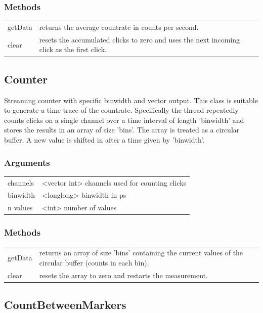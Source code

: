 \documentclass[oneside]{memoir}
\begin{document}
\subsubsection{Methods}
\begin{tabular}{p{}p{}}
  getData & returns the average countrate in counts per second.\\
  clear & resets the accumulated clicks to zero and uses the next incoming click as the first click.\\
\end{tabular}

\subsection{Counter}

Streaming counter with specific binwidth and vector output. This class
is suitable to generate a time trace of the countrate. Specifically
the thread repeatedly counts clicks on a single channel over a time interval of
length 'binwidth' and stores the results in an array of size 'bins'.
The array is treated as a circular buffer. A new value is shifted in
after a time given by 'binwidth'.
\subsubsection{Arguments}
\begin{tabular}{p{}p{}}
  channels & <vector int> channels used for counting clicks\\
  binwidth & <longlong> binwidth in ps\\
  n values & <int> number of values\\
\end{tabular}
\subsubsection{Methods}
\begin{tabular}{p{}p{}}
  getData & returns an array of size 'bins' containing the current values of the circular buffer
  (counts in each bin).\\
  clear & resets the array to zero and restarts the measurement.\\
\end{tabular}

\subsection{CountBetweenMarkers}
\end{document}
